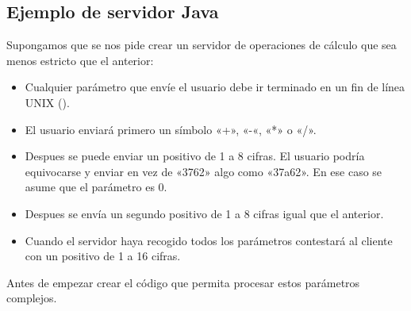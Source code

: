 \documentclass[letterpaper,10pt,spanish]{sphinxmanual}
\begin{document}
\subsection{Ejemplo de servidor Java}
\label{\detokenize{textos/tema3:ejemplo-de-servidor-java}}
Supongamos que se nos pide crear un servidor de operaciones de cálculo que sea menos estricto que el anterior:
\begin{itemize}
\item {} 
Cualquier parámetro que envíe el usuario debe ir terminado en un fin de línea UNIX ().

\item {} 
El usuario enviará primero un símbolo «+», «-«, «*» o «/».

\item {} 
Despues se puede enviar un positivo de 1 a 8 cifras. El usuario podría equivocarse y enviar en vez de «3762» algo como «37a62». En ese caso se asume que el parámetro es 0.

\item {} 
Despues se envía un segundo positivo de 1 a 8 cifras igual que el anterior.

\item {} 
Cuando el servidor haya recogido todos los parámetros contestará al cliente con un positivo de 1 a 16 cifras.

\end{itemize}

Antes de empezar crear el código que permita procesar estos parámetros complejos.
\end{document}
